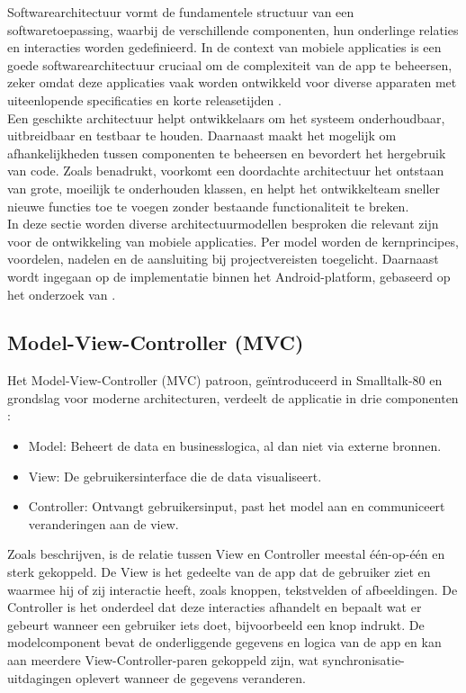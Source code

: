 Softwarearchitectuur vormt de fundamentele structuur van een softwaretoepassing, waarbij de verschillende componenten, hun onderlinge relaties en interacties worden gedefinieerd. In de context van mobiele applicaties is een goede softwarearchitectuur cruciaal om de complexiteit van de app te beheersen, zeker omdat deze applicaties vaak worden ontwikkeld voor diverse apparaten met uiteenlopende specificaties en korte releasetijden \autocite{Dobrean2019}. \\

Een geschikte architectuur helpt ontwikkelaars om het systeem onderhoudbaar, uitbreidbaar en testbaar te houden. Daarnaast maakt het mogelijk om afhankelijkheden tussen componenten te beheersen en bevordert het hergebruik van code. Zoals \textcite{Dobrean2019} benadrukt, voorkomt een doordachte architectuur het ontstaan van grote, moeilijk te onderhouden klassen, en helpt het ontwikkelteam sneller nieuwe functies toe te voegen zonder bestaande functionaliteit te breken.\\

In deze sectie worden diverse architectuurmodellen besproken die relevant zijn voor de ontwikkeling van mobiele applicaties. Per model worden de kernprincipes, voordelen, nadelen en de aansluiting bij projectvereisten toegelicht. Daarnaast wordt ingegaan op de implementatie binnen het Android-platform, gebaseerd op het onderzoek van \textcite{Lou2016}.\\

\subsection{Model-View-Controller (MVC)}
Het Model-View-Controller (MVC) patroon, geïntroduceerd in Smalltalk-80 en grondslag voor moderne architecturen, verdeelt de applicatie in drie componenten \autocite{Lou2016}:  
\begin{itemize}
	\item Model: Beheert de data en businesslogica, al dan niet via externe bronnen.  
	\item View: De gebruikersinterface die de data visualiseert.  
	\item Controller: Ontvangt gebruikersinput, past het model aan en communiceert veranderingen aan de view.  
\end{itemize}

Zoals \textcite{Lou2016} beschrijven, is de relatie tussen View en Controller meestal één-op-één en sterk gekoppeld. De View is het gedeelte van de app dat de gebruiker ziet en waarmee hij of zij interactie heeft, zoals knoppen, tekstvelden of afbeeldingen. De Controller is het onderdeel dat deze interacties afhandelt en bepaalt wat er gebeurt wanneer een gebruiker iets doet, bijvoorbeeld een knop indrukt. De modelcomponent bevat de onderliggende gegevens en logica van de app en kan aan meerdere View-Controller-paren gekoppeld zijn, wat synchronisatie-uitdagingen oplevert wanneer de gegevens veranderen.\\

